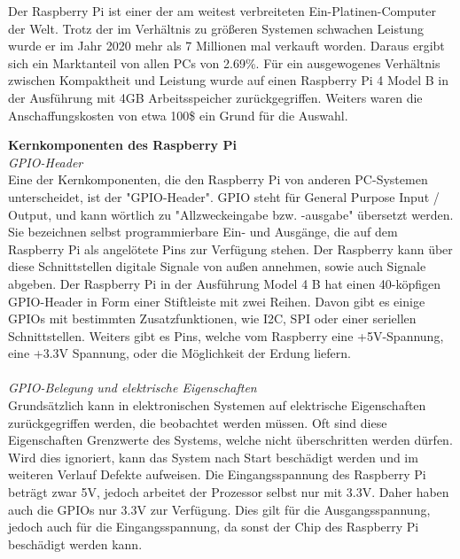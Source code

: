 Der Raspberry Pi ist einer der am weitest verbreiteten Ein-Platinen-Computer der Welt. Trotz der im Verhältnis zu größeren Systemen schwachen Leistung wurde er im Jahr 2020 mehr als 7 Millionen mal verkauft worden. Daraus ergibt sich ein Marktanteil von allen PCs von 2.69\%.
Für ein ausgewogenes Verhältnis zwischen Kompaktheit und Leistung wurde auf einen Raspberry Pi 4 Model B in der Ausführung mit 4GB Arbeitsspeicher zurückgegriffen. Weiters waren die Anschaffungskosten von etwa 100\$ ein Grund für die Auswahl. \cite{RaspyMarketShare}

\textbf{Kernkomponenten des Raspberry Pi}\\
\textit{GPIO-Header}\\
Eine der Kernkomponenten, die den Raspberry Pi von anderen PC-Systemen unterscheidet, ist der "GPIO-Header". GPIO steht für General Purpose Input / Output, und kann wörtlich zu "Allzweckeingabe bzw. -ausgabe" übersetzt werden. Sie bezeichnen selbst programmierbare Ein- und Ausgänge, die auf dem Raspberry Pi als angelötete Pins zur Verfügung stehen.
Der Raspberry kann über diese Schnittstellen digitale Signale von außen annehmen, sowie auch Signale abgeben.
Der Raspberry Pi in der Ausführung Model 4 B hat einen 40-köpfigen GPIO-Header in Form einer Stiftleiste mit zwei Reihen. Davon gibt es einige GPIOs mit bestimmten Zusatzfunktionen, wie I2C, SPI oder einer seriellen Schnittstellen. Weiters gibt es Pins, welche vom Raspberry eine +5V-Spannung, eine +3.3V Spannung, oder die Möglichkeit der Erdung liefern.\\ \\
\textit{GPIO-Belegung und elektrische Eigenschaften}\\
Grundsätzlich kann in elektronischen Systemen auf elektrische Eigenschaften zurückgegriffen werden, die beobachtet werden müssen. Oft sind diese Eigenschaften Grenzwerte des Systems, welche nicht überschritten werden dürfen. Wird dies ignoriert, kann das System nach Start beschädigt werden und im weiteren Verlauf Defekte aufweisen.
Die Eingangsspannung des Raspberry Pi beträgt zwar 5V, jedoch arbeitet der Prozessor selbst nur mit 3.3V. Daher haben auch die GPIOs nur 3.3V zur Verfügung. Dies gilt für die Ausgangsspannung, jedoch auch für die Eingangsspannung, da sonst der Chip des Raspberry Pi beschädigt werden kann. 
